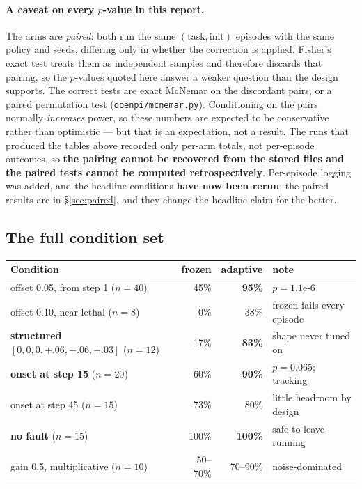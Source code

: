 \documentclass[11pt,a4paper]{article}
\newcommand{\code}[1]{\texttt{\small #1}}
\begin{document}
\paragraph{A caveat on every $p$-value in this report.}
The arms are \emph{paired}: both run the same $(\text{task}, \text{init})$ episodes with
the same policy and seeds, differing only in whether the correction is applied. Fisher's
exact test treats them as independent samples and therefore discards that pairing, so the
$p$-values quoted here answer a weaker question than the design supports. The correct
tests are exact McNemar on the discordant pairs, or a paired permutation test
(\code{openpi/mcnemar.py}). Conditioning on the pairs normally \emph{increases} power, so
these numbers are expected to be conservative rather than optimistic --- but that is an
expectation, not a result. The runs that produced the tables above recorded only per-arm
totals, not per-episode outcomes, so \textbf{the pairing cannot be recovered from the
stored files and the paired tests cannot be computed retrospectively}. Per-episode logging
was added, and the headline conditions \textbf{have now been rerun}; the paired
results are in \S\ref{sec:paired}, and they change the headline claim for the better.

\subsection{The full condition set}

\begin{center}
\begin{tabular}{lrrl}
\toprule
\textbf{Condition} & \textbf{frozen} & \textbf{adaptive} & \textbf{note} \\
\midrule
offset 0.05, from step 1 ($n{=}40$) & 45\% & \textbf{95\%} & $p = 1.1\text{e-}6$ \\
offset 0.10, near-lethal ($n{=}8$)  & 0\%  & 38\% & frozen fails every episode \\
\textbf{structured} $[0,0,0,{+}.06,{-}.06,{+}.03]$ ($n{=}12$) & 17\% & \textbf{83\%} & shape never tuned on \\
\textbf{onset at step 15} ($n{=}20$) & 60\% & \textbf{90\%} & $p = 0.065$; tracking \\
onset at step 45 ($n{=}15$) & 73\% & 80\% & little headroom by design \\
\textbf{no fault} ($n{=}15$) & 100\% & \textbf{100\%} & safe to leave running \\
gain 0.5, multiplicative ($n{=}10$) & 50--70\% & 70--90\% & noise-dominated \\
\bottomrule
\end{tabular}
\end{center}
\end{document}
